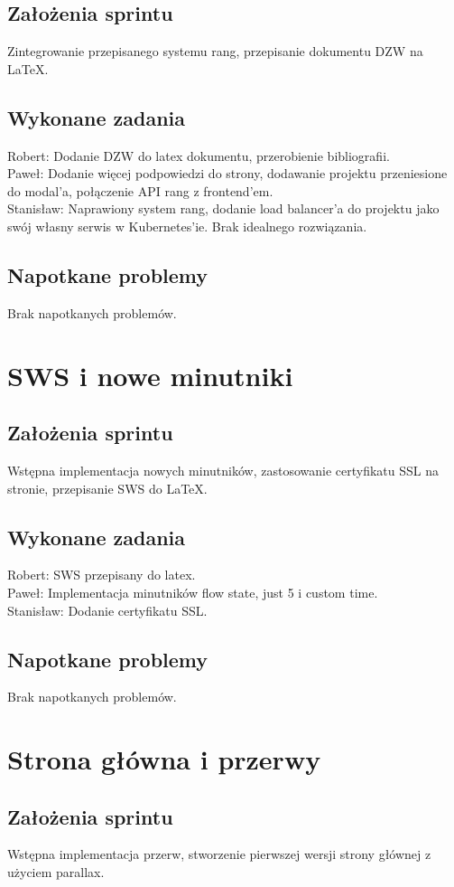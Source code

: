 \documentclass[a4paper,11pt]{report}
\begin{document}
\subsection {Założenia sprintu}
Zintegrowanie przepisanego systemu rang, przepisanie dokumentu DZW na LaTeX.
\subsection {Wykonane zadania}
Robert: Dodanie DZW do latex dokumentu, przerobienie bibliografii.\\ 
Paweł: Dodanie więcej podpowiedzi do strony, dodawanie projektu przeniesione do modal'a, połączenie API rang z frontend'em.\\
Stanisław: Naprawiony system rang, dodanie load balancer'a do projektu jako swój własny serwis w Kubernetes'ie. Brak idealnego rozwiązania. \\
\subsection {Napotkane problemy}
Brak napotkanych problemów.

\section {SWS i nowe minutniki}
\subsection {Założenia sprintu}
Wstępna implementacja nowych minutników, zastosowanie certyfikatu SSL na stronie, przepisanie SWS do LaTeX.
\subsection {Wykonane zadania}
Robert: SWS przepisany do latex.\\
Paweł: Implementacja minutników flow state, just 5 i custom time. \\ 
Stanisław: Dodanie certyfikatu SSL.  \\
\subsection {Napotkane problemy}
Brak napotkanych problemów.

\section {Strona główna i przerwy}
\subsection {Założenia sprintu}
Wstępna implementacja przerw, stworzenie pierwszej wersji strony głównej z użyciem parallax.
\end{document}
